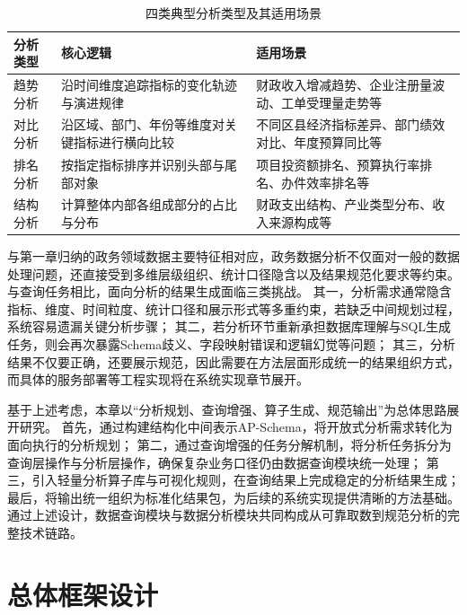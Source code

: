 \begin{table}[htbp]
	\setlength{\abovecaptionskip}{5pt}
	\setlength{\belowcaptionskip}{5pt}
    
	\caption{四类典型分析类型及其适用场景}\label{tab:analysis_types}
	\centering
	\footnotesize
    \renewcommand{\arraystretch}{1.2}
	\begin{tabular}{p{1.5cm}p{4.5cm}p{6.5cm}}
		\toprule
		分析类型 & 核心逻辑 & 适用场景 \\
		\midrule
		趋势分析 & 沿时间维度追踪指标的变化轨迹与演进规律 & 财政收入增减趋势、企业注册量波动、工单受理量走势等 \\
		对比分析 & 沿区域、部门、年份等维度对关键指标进行横向比较 & 不同区县经济指标差异、部门绩效对比、年度预算同比等 \\
		排名分析 & 按指定指标排序并识别头部与尾部对象 & 项目投资额排名、预算执行率排名、办件效率排名等 \\
		结构分析 & 计算整体内部各组成部分的占比与分布 & 财政支出结构、产业类型分布、收入来源构成等 \\
		\bottomrule
	\end{tabular}
\end{table}

与第一章归纳的政务领域数据主要特征相对应，政务数据分析不仅面对一般的数据处理问题，还直接受到多维层级组织、统计口径隐含以及结果规范化要求等约束。与查询任务相比，面向分析的结果生成面临三类挑战。
其一，分析需求通常隐含指标、维度、时间粒度、统计口径和展示形式等多重约束，若缺乏中间规划过程，系统容易遗漏关键分析步骤；
其二，若分析环节重新承担数据库理解与SQL生成任务，则会再次暴露Schema歧义、字段映射错误和逻辑幻觉等问题；
其三，分析结果不仅要正确，还要展示规范，因此需要在方法层面形成统一的结果组织方式，而具体的服务部署等工程实现将在系统实现章节展开。

基于上述考虑，本章以“分析规划、查询增强、算子生成、规范输出”为总体思路展开研究。
首先，通过构建结构化中间表示AP-Schema，将开放式分析需求转化为面向执行的分析规划；
第二，通过查询增强的任务分解机制，将分析任务拆分为查询层操作与分析层操作，确保复杂业务口径仍由数据查询模块统一处理；
第三，引入轻量分析算子库与可视化规则，在查询结果上完成稳定的分析结果生成；
最后，将输出统一组织为标准化结果包，为后续的系统实现提供清晰的方法基础。
通过上述设计，数据查询模块与数据分析模块共同构成从可靠取数到规范分析的完整技术链路。


\section{总体框架设计}

